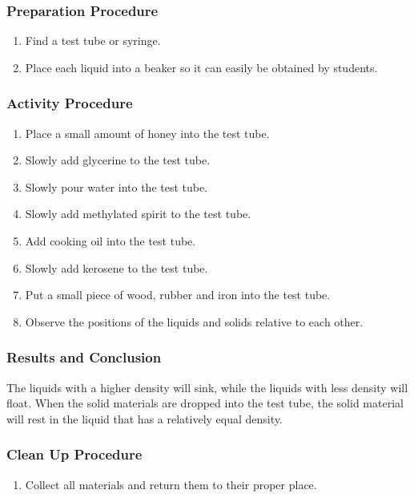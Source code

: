 \subsubsection*{Preparation Procedure}
\begin{enumerate}
\item{Find a test tube or syringe.}
\item{Place each liquid into a beaker so it can easily be obtained by students.} 
\end{enumerate}

\subsubsection*{Activity Procedure}
\begin{enumerate}
\item{Place a small amount of honey into the test tube.} 
\item{Slowly add glycerine to the test tube.} 
\item{Slowly pour water into the test tube.} 
\item{Slowly add methylated spirit to the test tube.} 
\item{Add cooking oil into the test tube.} 
\item{Slowly add kerosene to the test tube.} 
\item{Put a small piece of wood, rubber and iron into the test tube.}
\item{Observe the positions of the liquids and solids relative to each other.}
\end{enumerate}

\subsubsection*{Results and Conclusion}
The liquids with a higher density will sink, while the liquids with less density will float. When the solid materials are dropped into the test tube, the solid material will rest in the liquid that has a relatively equal density.  

\subsubsection*{Clean Up Procedure}
\begin{enumerate}
\item{Collect all materials and return them to their proper place.} 
\end{enumerate}

